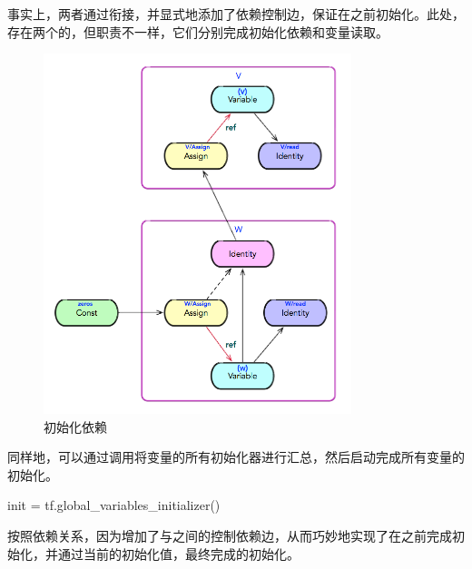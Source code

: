 \begin{content}
事实上，两者通过衔接，并显式地添加了依赖控制边，保证在之前初始化。此处，存在两个的，但职责不一样，它们分别完成初始化依赖和变量读取。


\begin{figure}[!h]
\centering
\includegraphics[width=0.8\textwidth]{figures/variable-initialization-dependency-1.png}
\caption{初始化依赖}
 \label{fig:variable-initialization-dependency-1}
\end{figure}

同样地，可以通过调用将变量的所有初始化器进行汇总，然后启动完成所有变量的初始化。

\begin{leftbar}
\begin{python}
init = tf.global_variables_initializer()
\end{python}
\end{leftbar}

按照依赖关系，因为增加了与之间的控制依赖边，从而巧妙地实现了在之前完成初始化，并通过当前的初始化值，最终完成的初始化。


\end{content}

